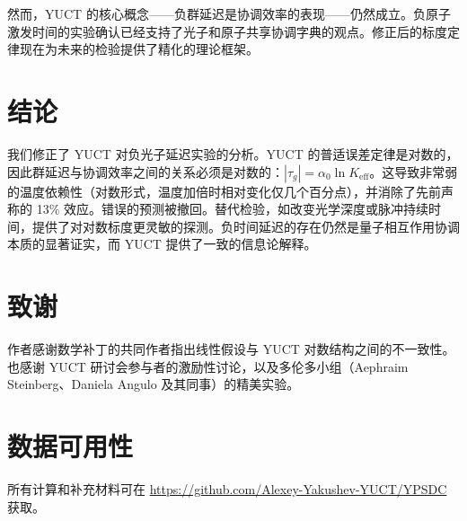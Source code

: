 \documentclass[12pt,a4paper]{article}
\newcommand{\Keff}{K_{\mathrm{eff}}}
\begin{document}
	然而，YUCT 的核心概念——负群延迟是协调效率的表现——仍然成立。负原子激发时间的实验确认已经支持了光子和原子共享协调字典的观点。修正后的标度定律现在为未来的检验提供了精化的理论框架。
	
	\section{结论}
	
	我们修正了 YUCT 对负光子延迟实验的分析。YUCT 的普适误差定律是对数的，因此群延迟与协调效率之间的关系必须是对数的：\(|\tau_g| = \alpha_0 \ln\Keff\)。这导致非常弱的温度依赖性（对数形式，温度加倍时相对变化仅几个百分点），并消除了先前声称的 13\% 效应。错误的预测被撤回。替代检验，如改变光学深度或脉冲持续时间，提供了对对数标度更灵敏的探测。负时间延迟的存在仍然是量子相互作用协调本质的显著证实，而 YUCT 提供了一致的信息论解释。
	
	\section*{致谢}
	
	作者感谢数学补丁的共同作者指出线性假设与 YUCT 对数结构之间的不一致性。也感谢 YUCT 研讨会参与者的激励性讨论，以及多伦多小组（Aephraim Steinberg、Daniela Angulo 及其同事）的精美实验。
	
	\section*{数据可用性}
	
	所有计算和补充材料可在 \url{https://github.com/Alexey-Yakushev-YUCT/YPSDC} 获取。
	
\end{document}
